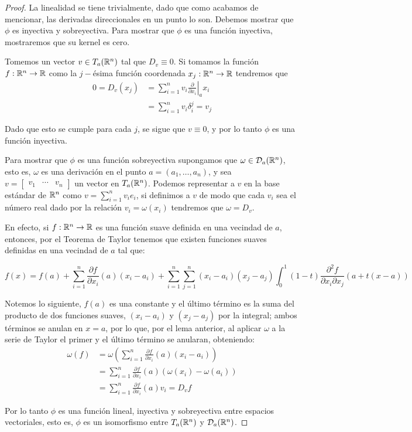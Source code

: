 \begin{proof}
	La linealidad se tiene trivialmente, dado que como acabamos de mencionar, las derivadas direccionales en un punto lo son. Debemos mostrar que $\phi$ es inyectiva y sobreyectiva. Para mostrar que $\phi$ es una función inyectiva, mostraremos que su kernel es cero.

	Tomemos un vector $v \in T_a(\mathbb{R}^n)$ tal que $D_v \equiv 0$. Si tomamos la función $f: \mathbb{R}^n \to \mathbb{R}$ como la $j-$ésima función coordenada $x_j: \mathbb{R}^n \to \mathbb{R}$ tendremos que
	\begin{align*}
		0 = D_v(x_j) & = \left. \sum_{i=1}^{n} v_i \frac{\partial}{\partial x_i} \right|_{a} x_i \\
		             & = \sum_{i=1}^{n} v_i \delta_i^j = v_j
	\end{align*}

	Dado que esto se cumple para cada $j$, se sigue que $v \equiv 0$, y por lo tanto $\phi$ es una función inyectiva.

	Para mostrar que $\phi$ es una función sobreyectiva supongamos que $\omega \in \mathcal{D}_a(\mathbb{R}^n)$, esto es, $\omega$ es una derivación en el punto $a = (a_1, \dots, a_n)$, y sea $v = \begin{bmatrix} v_1 & \cdots & v_n \end{bmatrix}$ un vector en $T_a(\mathbb{R}^n)$. Podemos representar a $v$ en la base estándar de $\mathbb{R}^n$ como $v = \sum_{i=1}^{n} v_i e_i$, si definimos a $v$ de modo que cada $v_i$ sea el número real dado por la relación $v_i = \omega(x_i)$ tendremos que $\omega = D_v$.

	En efecto, si $f: \mathbb{R}^n \to \mathbb{R}$ es una función suave definida en una vecindad de $a$, entonces, por el Teorema de Taylor tenemos que existen funciones suaves definidas en una vecindad de $a$ tal que:

	\[
		f(x) = f(a) + \sum_{i=1}^{n} \frac{\partial f}{\partial x_i} (a) (x_i - a_i) + \sum_{i=1}^{n} \sum_{j=1}^{n} (x_i - a_i)(x_j - a_j) \int_{0}^{1} (1-t) \frac{\partial^2 f}{\partial x_i \partial x_j} (a + t(x - a))
	\]

	Notemos lo siguiente, $f(a)$ es una constante y el último término es la suma del producto de dos funciones suaves, $(x_i - a_i)$ y $(x_j - a_j)$ por la integral; ambos términos se anulan en $x = a$, por lo que, por el lema anterior, al aplicar $\omega$ a la serie de Taylor el primer y el último término se anularan, obteniendo:
	\begin{align*}
		\omega(f) & = \omega(\sum_{i=1}^{n} \frac{\partial f}{\partial x_i} (a )(x_i - a_i))         \\
		          & = \sum_{i=1}^{n} \frac{\partial f}{\partial x_i} (a)(\omega(x_i) - \omega(a_i)) \\
		          & = \sum_{i=1}^{n} \frac{\partial f}{\partial x_i}(a) v_i = D_v f
	\end{align*}

	Por lo tanto $\phi$ es una función lineal, inyectiva y sobreyectiva entre espacios vectoriales, esto es, $\phi$ es un isomorfismo entre $T_a(\mathbb{R}^n)$ y $\mathcal{D}_a(\mathbb{R}^n)$.
\end{proof}

